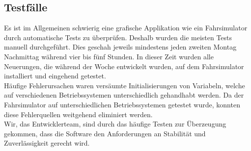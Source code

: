 \subsection{Testfälle}
Es ist im Allgemeinen schwierig eine grafische Applikation wie ein Fahrsimulator durch automatische Tests zu überprüfen. Deshalb wurden die meisten Tests manuell durchgeführt. Dies geschah jeweils mindestens jeden zweiten Montag Nachmittag während vier bis fünf Stunden. In dieser Zeit wurden alle Neuerungen, die während der Woche entwickelt wurden, auf dem Fahrsimulator installiert und eingehend getestet. \\
Häufige Fehlerursachen waren versäumte Initialisierungen von Variabeln, welche auf verschiedenen Betriebssystemen unterschiedlich gehandhabt werden. Da der Fahrsimulator auf unterschiedlichen Betriebssystemen getestet wurde, konnten diese Fehlerquellen weitgehend eliminiert werden. \\
Wir, das Entwicklerteam, sind durch das häufige Testen zur Überzeugung gekommen, dass die Software den Anforderungen an Stabilität und Zuverlässigkeit gerecht wird.